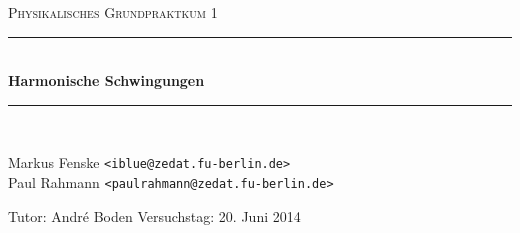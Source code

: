 \newcommand{\HRule}{\rule{\linewidth}{0.5mm}}

\begin{center}
  \textsc{\Large Physikalisches Grundpraktkum 1}
  \HRule\\[0.4 cm]
  {\huge \bfseries Harmonische Schwingungen}
  \HRule\\[0.4 cm]

  \begin{minipage}{0.65\textwidth}
  \begin{flushleft}
    Markus Fenske \texttt{<iblue@zedat.fu-berlin.de>} \\
    Paul Rahmann \texttt{<paulrahmann@zedat.fu-berlin.de>}
  \end{flushleft}
  \end{minipage}
  \hfill
  \begin{minipage}{0.30\textwidth}
  \begin{flushright}
    Tutor: André Boden
    Versuchstag: 20. Juni 2014
  \end{flushright}
  \end{minipage}

  \vspace{1cm}

  \tableofcontents

  \vfill
\end{center}
\newpage
